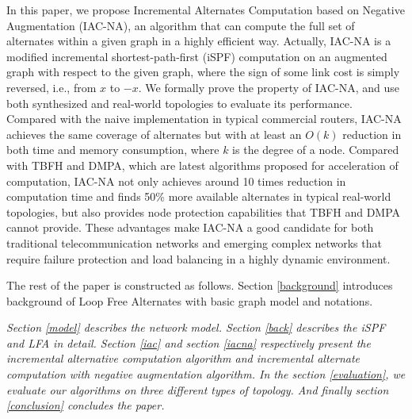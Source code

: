 In this paper, we propose Incremental Alternates Computation based on Negative 
Augmentation (IAC-NA), an algorithm that can 
compute the full set of alternates within a given graph in a highly efficient way. 
Actually, IAC-NA is a modified incremental shortest-path-first (iSPF) computation
on an augmented graph with respect to the given graph, where the sign of some link cost 
is simply reversed, i.e., from $x$ to $-x$. We formally prove the property of IAC-NA, 
and use both synthesized and real-world topologies to evaluate its performance.
Compared with the naive implementation in typical commercial routers, IAC-NA achieves the same coverage of alternates but  
with at least an $O(k)$ reduction in both time and memory consumption, where $k$ is the degree of a node. 
Compared with TBFH and DMPA, which are latest algorithms proposed for acceleration of computation, 
IAC-NA not only achieves around 10 times reduction in computation time 
and finds 50\% more available alternates in typical real-world topologies, but also 
provides  node protection capabilities that TBFH and DMPA cannot provide.
These advantages make IAC-NA a good candidate for both traditional telecommunication networks 
and emerging complex networks that require failure protection and load balancing 
in a highly dynamic environment.
\iffalse
Our contributions are summarized as follows:
\begin{itemize}
\item We propose an incremental alternates computation (IAC) algorithm based on iSPF, which can compute all the next hops satisfied DC rule. %
\item Theoretical analysis indicates that the computation complexity of IAC is less than that of constructing a shortest path tree and  can provide the same network availability as DC.
\item We propose an IAC-NA algorithm which can  efficiently calculate
the minimum cost of all its neighbors to all other nodes of the
network on the shortest path tree rooted at the compute node. Therefore
IAC-NA can completely and efficiently deal with LFA problem.
\item Theoretical analysis and experiments results indicate that IAC-NA can provide the same network availability as LFA.
\end{itemize}
\fi



The rest of the paper is constructed as follows. 
Section \ref{background} introduces background of Loop Free Alternates with basic graph model and notations.

{\em Section \ref{model}  describes the network model.
Section \ref{back} describes the iSPF and LFA in detail.
Section \ref{iac} and section \ref{iacna} respectively present the incremental alternative computation algorithm and incremental alternate computation with negative augmentation algorithm.
In the section \ref{evaluation}, we evaluate our algorithms on three different types of topology.  And finally section \ref{conclusion} concludes the paper.
}



